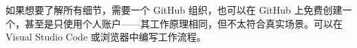 如果想要了解所有细节，需要一个 GitHub 组织，也可以在 GitHub 上免费创建一个，甚至是只使用个人账户——其工作原理相同，但不太符合真实场景。可以在 Visual Studio Code 或浏览器中编写工作流程。